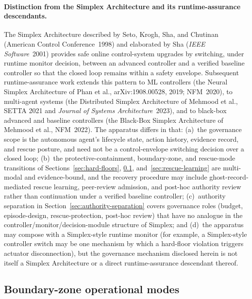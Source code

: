\documentclass[a4paper,12pt]{article}
\begin{document}
\paragraph{Distinction from the Simplex Architecture and its
runtime-assurance descendants.}
The Simplex Architecture described by Seto, Krogh, Sha, and
Chutinan (American Control Conference~1998) and elaborated by
Sha (\emph{IEEE Software}~2001) provides safe online
control-system upgrades by switching, under runtime monitor
decision, between an advanced controller and a verified baseline
controller so that the closed loop remains within a safety
envelope. Subsequent runtime-assurance work extends this pattern
to ML controllers (the Neural Simplex Architecture of Phan
et al., arXiv:1908.00528, 2019; NFM~2020), to multi-agent systems
(the Distributed Simplex Architecture of Mehmood et al., SETTA
2021 and \emph{Journal of Systems Architecture}~2023), and to
black-box advanced and baseline controllers (the Black-Box
Simplex Architecture of Mehmood et al., NFM~2022). The apparatus
differs in that: (a)~the governance scope is the autonomous
agent's lifecycle state, action history, evidence record, and
rescue posture, and need not be a control-envelope switching
decision over a closed loop; (b)~the protective-containment,
boundary-zone, and rescue-mode transitions of
Sections~\ref{sec:hard-floors}, \ref{sec:boundary-zones},
and~\ref{sec:rescue-learning} are multi-modal and
evidence-bound, and the recovery procedure may include
ghost-record-mediated rescue learning, peer-review admission, and
post-hoc authority review rather than continuation under a
verified baseline controller; (c)~authority separation in
Section~\ref{sec:authority-separation} covers governance roles
(budget, episode-design, rescue-protection, post-hoc review)
that have no analogue in the controller/monitor/decision-module
structure of Simplex; and (d)~the apparatus may compose with a
Simplex-style runtime monitor (for example, a Simplex-style
controller switch may be one mechanism by which a hard-floor
violation triggers actuator disconnection), but the governance
mechanism disclosed herein is not itself a Simplex Architecture
or a direct runtime-assurance descendant thereof.

\subsection{Boundary-zone operational modes}
\label{sec:boundary-zones}
\end{document}

